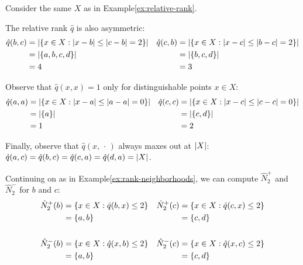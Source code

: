 \documentclass{article}
\begin{document}
\begin{example}\label{ex:relative-rank-max}
Consider the same $X$ as in Example\nbs\ref{ex:relative-rank}.

The relative rank $\hat{q}$ is also asymmetric:
\begin{align*}
    \hat{q}(b,c) &= \lvert \{x \in X : \lvert x-b\rvert \leq \lvert c-b\rvert = 2\}\rvert &
    \hat{q}(c,b) &= \lvert \{x \in X : \lvert x-c\rvert \leq \lvert b-c\rvert = 2\}\rvert \\
        &= \lvert \{a, b, c, d\}\rvert &&= \lvert \{b, c, d\}\rvert \\
        &= 4 &&= 3
\end{align*}

Observe that $\hat{q}(x,x) = 1$ only for distinguishable points $x \in X$:
\begin{align*}
    \hat{q}(a,a) &= \lvert \{x \in X : \lvert x-a\rvert \leq \lvert a-a\rvert = 0\}\rvert &
    \hat{q}(c,c) &= \lvert \{x \in X : \lvert x-c\rvert \leq \lvert c-c\rvert = 0\}\rvert \\
       &= \lvert \{a\}\rvert &&= \lvert \{c, d\}\rvert \\
       &= 1 &&= 2
\end{align*}

Finally, observe that $\hat{q}(x,\,\cdot\,)$ always maxes out at $\lvert X\rvert$: $\hat{q}(a,c) = \hat{q}(b,c) = \hat{q}(c,a) = \hat{q}(d,a) = \lvert X\rvert$.

Continuing on as in Example\nbs\ref{ex:rank-neighborhoods}, we can compute $\hat{N}_2^+$ and $\hat{N}_2^-$ for $b$ and $c$:
\begin{align*}
    \hat{N}_2^+ (b) &= \{x \in X : \hat{q}(b,x) \leq 2\} &
    \hat{N}_2^+ (c) &= \{x \in X : \hat{q}(c,x) \leq 2\} \\
        &= \{a, b\} &&= \{c, d\} \\
        \\
    \hat{N}_2^- (b) &= \{x \in X : \hat{q}(x,b) \leq 2\} &
    \hat{N}_2^- (c) &= \{x \in X : \hat{q}(x,c) \leq 2\} \\
        &= \{a, b\} &&= \{c, d\}
\end{align*}


\end{example}
\end{document}
